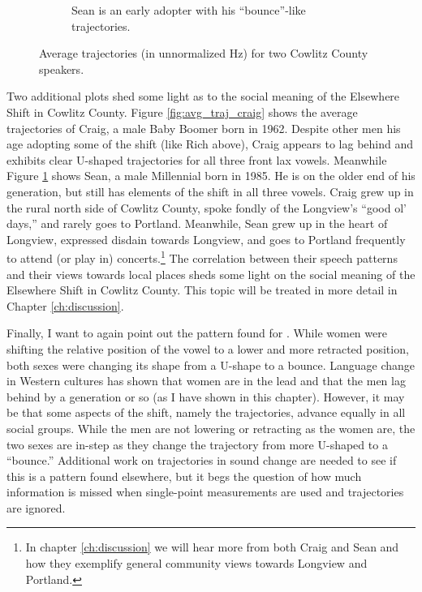 \begin{figure}[tb!]
\begin{subfigure}[t]{2.925in}
        \caption{Sean is an early adopter with his ``bounce''-like trajectories.}
        \label{fig:avg_traj_sean}
    \end{subfigure}
    \hspace{\fill}
    \caption{Average trajectories (in unnormalized Hz) for two Cowlitz County speakers.}
    \label{fig:craig_and_sean}
\end{figure}

Two additional plots shed some light as to the social meaning of the Elsewhere Shift in Cowlitz County. Figure \ref{fig:avg_traj_craig} shows the average trajectories of Craig, a male Baby Boomer born in 1962. Despite other men his age adopting some of the shift (like Rich above), Craig appears to lag behind and exhibits clear U-shaped trajectories for all three front lax vowels. Meanwhile Figure \ref{fig:avg_traj_sean} shows Sean, a male Millennial born in 1985. He is on the older end of his generation, but still has elements of the shift in all three vowels. Craig grew up in the rural north side of Cowlitz County, spoke fondly of the Longview's ``good ol' days,'' and rarely goes to Portland. Meanwhile, Sean grew up in the heart of Longview, expressed disdain towards Longview, and goes to Portland frequently to attend (or play in) concerts.\footnote{In chapter \ref{ch:discussion} we will hear more from both Craig and Sean and how they exemplify general community views towards Longview and Portland.} The correlation between their speech patterns and their views towards local places sheds some light on the social meaning of the Elsewhere Shift in Cowlitz County. This topic will be treated in more detail in Chapter \ref{ch:discussion}.

Finally, I want to again point out the pattern found for \bet. While women were shifting the relative position of the vowel to a lower and more retracted position, both sexes were changing its shape from a U-shape to a bounce. Language change in Western cultures has shown that women are in the lead and that the men lag behind by a generation or so (as I have shown in this chapter). However, it may be that some aspects of the shift, namely the trajectories, advance equally in all social groups. While the men are not lowering or retracting \bet as the women are, the two sexes are in-step as they change the trajectory from more U-shaped to a ``bounce.'' Additional work on trajectories in sound change are needed to see if this is a pattern found elsewhere, but it begs the question of how much information is missed when single-point measurements are used and trajectories are ignored.



